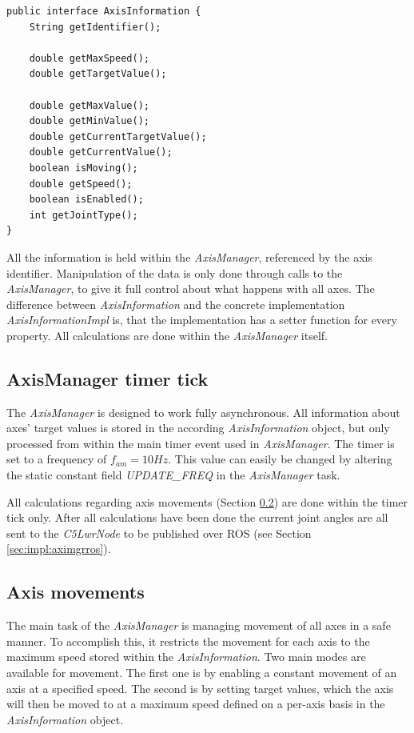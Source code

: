 \begin{lstlisting}[caption={The AxisInformation interface}, label=lst:impl:axisinformation]
public interface AxisInformation {
	String getIdentifier();
	
	double getMaxSpeed();
	double getTargetValue();
	
	double getMaxValue();
	double getMinValue();
	double getCurrentTargetValue();
	double getCurrentValue();
	boolean isMoving();
	double getSpeed();
	boolean isEnabled();
	int getJointType();
}
\end{lstlisting}

All the information is held within the \textit{AxisManager}, referenced by the axis identifier. Manipulation of the data is only done through calls to the \textit{AxisManager}, to give it full control about what happens with all axes. The difference between \textit{AxisInformation} and the concrete implementation \textit{AxisInformationImpl} is, that the implementation has a setter function for every property. All calculations are done within the \textit{AxisManager} itself.

\subsection{AxisManager timer tick}

The \textit{AxisManager} is designed to work fully asynchronous. All information about axes' target values is stored in the according \textit{AxisInformation} object, but only processed from within the main timer event used in \textit{AxisManager}. The timer is set to a frequency of $f_{am} = 10Hz$. This value can easily be changed by altering the static constant field \textit{UPDATE\_FREQ} in the \textit{AxisManager} task.

All calculations regarding axis movements (Section \ref{sec:impl:axismovements}) are done within the timer tick only. After all calculations have been done the current joint angles are all sent to the \textit{C5LwrNode} to be published over ROS (see Section \ref{sec:impl:aximgrros}).

\subsection{Axis movements}
\label{sec:impl:axismovements}

The main task of the \textit{AxisManager} is managing movement of all axes in a safe manner. To accomplish this, it restricts the movement for each axis to the maximum speed stored within the \textit{AxisInformation}. Two main modes are available for movement. The first one is by enabling a constant movement of an axis at a specified speed. The second is by setting target values, which the axis will then be moved to at a maximum speed defined on a per-axis basis in the \textit{AxisInformation} object.

